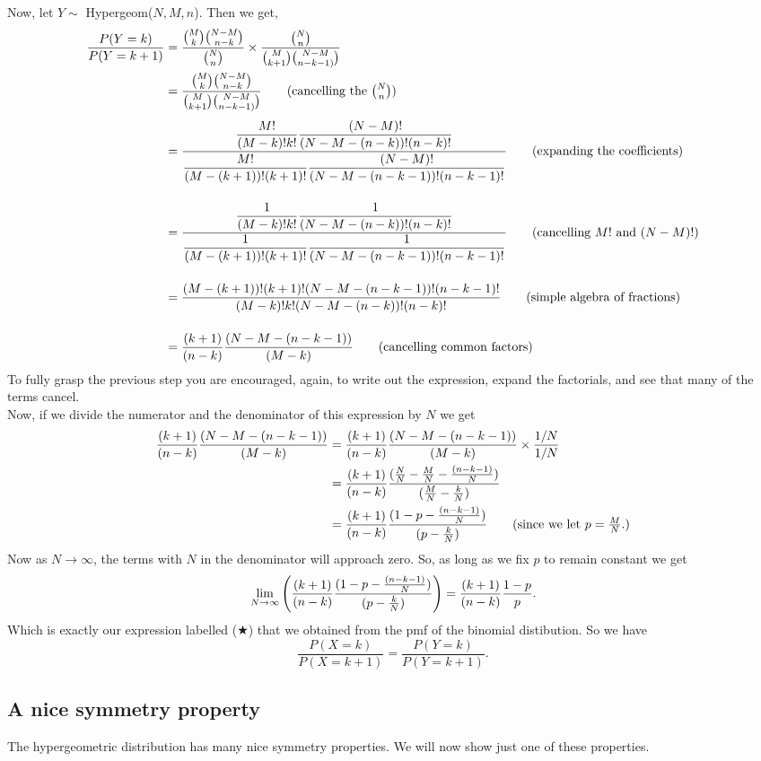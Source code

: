\noindent Now, let $Y \sim$ Hypergeom($N,M,n$). Then we get,
\begin{align*}
\frac{P(Y = k)}{P(Y = k+1)} & = \frac{\binom{M}{k}\binom{N-M}{n-k}}{\binom{N}{n}} \times \frac{\binom{N}{n}}{\binom{M}{k+1}\binom{N-M}{n-k-1)}} \\
	& = \frac{\binom{M}{k}\binom{N-M}{n-k}}{\binom{M}{k+1}\binom{N-M}{n-k-1)}} \tag{cancelling the $\binom{N}{n}$} \ssk
	& = \frac{\displaystyle{\frac{M!}{(M-k)!k!}\frac{(N-M)!}{(N-M-(n-k))!(n-k)!}}}{\displaystyle{\frac{M!}{(M-(k+1))!(k+1)!}\frac{(N-M)!}{(N-M-(n-k-1))!(n-k-1)!}}} \tag{expanding the coefficients} \bsk
	& =  \frac{\displaystyle{\frac{1}{(M-k)!k!}\frac{1}{(N-M-(n-k))!(n-k)!}}}{\displaystyle{\frac{1}{(M-(k+1))!(k+1)!}\frac{1}{(N-M-(n-k-1))!(n-k-1)!}}} \tag{cancelling $M!$ and $(N-M)!$} \bsk
	& = \frac{(M-(k+1))!(k+1)!(N-M-(n-k-1))!(n-k-1)!}{(M-k)!k!(N-M-(n-k))!(n-k)!} \tag{simple algebra of fractions} \bsk
	& = \frac{(k+1)}{(n-k)}\frac{(N-M-(n-k-1))}{(M-k)} \tag{cancelling common factors}
\end{align*}
To fully grasp the previous step you are encouraged, again, to write out the expression, expand the factorials, and see that many of the terms cancel. \\

\noindent Now, if we divide the numerator and the denominator of this expression by $N$ we get
\begin{align*}
\frac{(k+1)}{(n-k)}\frac{(N-M-(n-k-1))}{(M-k)}
	& = \frac{(k+1)}{(n-k)}\frac{(N-M-(n-k-1))}{(M-k)} \times \frac{1/N}{1/N} \\
	& = \frac{(k+1)}{(n-k)}\frac{(\frac{N}{N}-\frac{M}{N}-\frac{(n-k-1)}{N})}{(\frac{M}{N}-\frac{k}{N})} \\
	& = \frac{(k+1)}{(n-k)}\frac{(1-p-\frac{(n-k-1)}{N})}{(p-\frac{k}{N})} \tag{since we let $p = \frac{M}{N}$.}
\end{align*}
Now as $N \rightarrow \infty$, the terms with $N$ in the denominator will approach zero. So, as long as we fix $p$ to remain constant we get
\[
\lim_{N\rightarrow\infty}\left(\frac{(k+1)}{(n-k)}\frac{(1-p-\frac{(n-k-1)}{N})}{(p-\frac{k}{N})}\right) = \frac{(k+1)}{(n-k)}\frac{1-p}{p}.
\]
Which is exactly our expression labelled ($\bigstar$) that we obtained from the pmf of the binomial distibution. So we have
\[
\frac{P(X=k)}{P(X=k+1)} = \frac{P(Y=k)}{P(Y = k+1)}. \label{unfinished1}
\]

\subsection{A nice symmetry property}
The hypergeometric distribution has many nice symmetry properties. We will now show just one of these properties. \\

